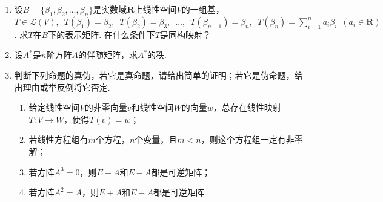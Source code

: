 \begin{enumerate}
    \item 设$B=\{\beta_1,\beta_2,\ldots,\beta_n\}$是实数域$\mathbf{R}$上线性空间$V$的一组基，$T\in\mathcal{L}(V),\enspace T(\beta_1)=\beta_2,\enspace T(\beta_2)=\beta_3,\enspace \ldots,\enspace T(\beta_{n-1})=\beta_n,\enspace T(\beta_n)=\sum\limits_{i=1}^{n}a_i\beta_i\enspace(a_i\in\mathbf{R})$. 求$T$在$B$下的表示矩阵. 在什么条件下$T$是同构映射？

    \item 设$A^*$是$n$阶方阵$A$的伴随矩阵，求$A^*$的秩.

    \item 判断下列命题的真伪，若它是真命题，请给出简单的证明；若它是伪命题，给出理由或举反例将它否定.
    \begin{enumerate}
        \item 给定线性空间$V$的非零向量$v$和线性空间$W$的向量$w$，总存在线性映射$T\colon V\to W$，使得$T(v)=w$；

        \item 若线性方程组有$m$个方程，$n$个变量，且$m<n$，则这个方程组一定有非零解；

        \item 若方阵$A^3=0$，则$E+A$和$E-A$都是可逆矩阵；

        \item 若方阵$A^2=A$，则$E+A$和$E-A$都是可逆矩阵.
    \end{enumerate}
\end{enumerate}

\clearpage
